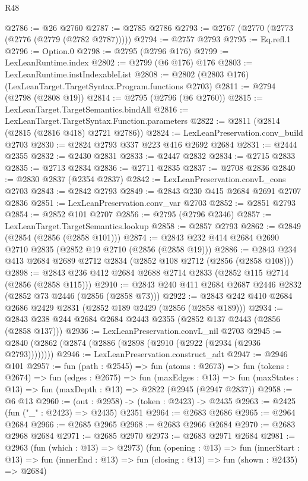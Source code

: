 \begin{lexlean}{R48}
\begin{coremodule}
@2786 := @26 @2760
@2787 := @2785 @2786
@2793 := @2767 (@2770 (@2773 (@2776 (@2779 (@2782 @2787)))))
@2794 := @2757 @2793
@2795 := Eq.refl.{1}
@2796 := Option.{0}
@2798 := @2795 (@2796 @176)
@2799 := LexLeanRuntime.index
@2802 := @2799 (@6 @176) @176
@2803 := LexLeanRuntime.instIndexableList
@2808 := @2802 (@2803 @176) (LexLeanTarget.TargetSyntax.Program.functions @2703)
@2811 := @2794 (@2798 (@2808 @19))
@2814 := @2795 (@2796 (@6 @2760))
@2815 := LexLeanTarget.TargetSemantics.bindAll
@2816 := LexLeanTarget.TargetSyntax.Function.parameters
@2822 := @2811 (@2814 (@2815 (@2816 @418) @2721 @2786))
@2824 := LexLeanPreservation.conv_build @2703
@2830 := @2824 @2793 @337 @223 @416 @2692 @2684
@2831 := @2444 @2355
@2832 := @2430 @2831
@2833 := @2447 @2832
@2834 := @2715 @2833
@2835 := @2713 @2834
@2836 := @2711 @2835
@2837 := @2708 @2836
@2840 := @2830 @2837 (@2354 @2837)
@2842 := LexLeanPreservation.convL_cons @2703
@2843 := @2842 @2793
@2849 := @2843 @230 @415 @2684 @2691 @2707 @2836
@2851 := LexLeanPreservation.conv_var @2703
@2852 := @2851 @2793
@2854 := @2852 @101 @2707
@2856 := @2795 (@2796 @2346)
@2857 := LexLeanTarget.TargetSemantics.lookup
@2858 := @2857 @2793
@2862 := @2849 (@2854 (@2856 (@2858 @101)))
@2874 := @2843 @232 @414 @2684 @2690 @2710 @2835 (@2852 @19 @2710 (@2856 (@2858 @19)))
@2886 := @2843 @234 @413 @2684 @2689 @2712 @2834 (@2852 @108 @2712 (@2856 (@2858 @108)))
@2898 := @2843 @236 @412 @2684 @2688 @2714 @2833 (@2852 @115 @2714 (@2856 (@2858 @115)))
@2910 := @2843 @240 @411 @2684 @2687 @2446 @2832 (@2852 @73 @2446 (@2856 (@2858 @73)))
@2922 := @2843 @242 @410 @2684 @2686 @2429 @2831 (@2852 @189 @2429 (@2856 (@2858 @189)))
@2934 := @2843 @238 @244 @2684 @2684 @2443 @2355 (@2852 @137 @2443 (@2856 (@2858 @137)))
@2936 := LexLeanPreservation.convL_nil @2703
@2945 := @2840 (@2862 (@2874 (@2886 (@2898 (@2910 (@2922 (@2934 (@2936 @2793))))))))
@2946 := LexLeanPreservation.construct_adt
@2947 := @2946 @101
@2957 := fun (path : @2545) =>
  fun (atoms : @2673) =>
  fun (tokens : @2674) =>
  fun (edges : @2675) =>
  fun (maxEdges : @13) =>
  fun (maxStates : @13) => fun (maxDepth : @13) => @2822 (@2945 (@2947 @2837))
@2958 := @6 @13
@2960 := (out : @2958) -> (token : @2423) -> @2435
@2963 := @2425 (fun ("_" : @2423) => @2435) @2351
@2964 := @2683 @2686
@2965 := @2964 @2684
@2966 := @2685 @2965
@2968 := @2683 @2966 @2684
@2970 := @2683 @2968 @2684
@2971 := @2685 @2970
@2973 := @2683 @2971 @2684
@2981 := @2963
    (fun (which : @13) => @2973)
    (fun (opening : @13) =>
    fun (innerStart : @13) =>
    fun (innerEnd : @13) => fun (closing : @13) => fun (shown : @2435) => @2684)

\end{coremodule}
\end{lexlean}
